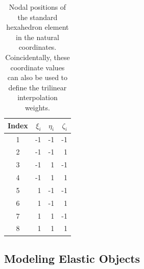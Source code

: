 \begin{table}
	\begin{center}
		\begin{tabular}{ |c| r r r|}
			\hline
			Index & $\xi_i$ & $\eta_i$ & $\zeta_i$ \\ \hline
			1 & -1 & -1 & -1\\  
			2 & -1 & -1 & 1\\
			3 & -1 & 1 & -1\\  
			4 & -1 & 1 & 1\\
			5 & 1 & -1 & -1\\  
			6 & 1 & -1 & 1\\
			7 & 1 & 1 & -1\\  
			8 & 1 & 1 & 1\\
		\hline						
		\end{tabular}
	\end{center}
	\caption{Nodal positions of the standard hexahedron element in the natural coordinates.
		Coincidentally, these coordinate values can also be used to define the trilinear interpolation weights.}
	\label{tab:natCoord}
\end{table}

\subsection{Modeling Elastic Objects}

\section{}

